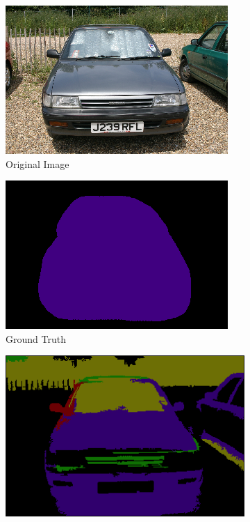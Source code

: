 \documentclass{article} %
\begin{document}
\begin{figure}[htb]
	\begin{subfigure}[t]{0.19\textwidth}
		\centering
		\includegraphics[width = \textwidth]{./img/7_18_s.png}
		\parbox{.95\textwidth}{\caption{Original Image \label{fig:orig_car}}}
			\end{subfigure}
	\begin{subfigure}[t]{0.19\textwidth}
		\centering
		\includegraphics[width = \textwidth]{./img/7_18_s_GT.png}
		\parbox{0.95\textwidth}{\caption{Ground Truth \label{fig:GT_car}}}
	\end{subfigure}
	\begin{subfigure}[t]{0.19\textwidth}
		\centering
		\includegraphics[width = \textwidth]{./img/7_18_s_prior.png}

\end{subfigure}
\end{figure}
\end{document}

